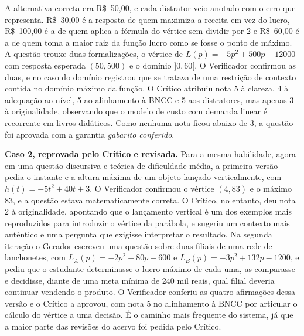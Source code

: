 \noindent A alternativa correta era R\$~50,00, e cada distrator veio anotado com o erro que
representa. R\$~30,00 é a resposta de quem maximiza a receita em vez do lucro, R\$~100,00 é a de
quem aplica a fórmula do vértice sem dividir por 2 e R\$~60,00 é a de quem toma a maior raiz da
função lucro como se fosse o ponto de máximo. A questão trouxe duas formalizações, o vértice de
$L(p) = -5p^2 + 500p - 12000$ com resposta esperada $(50, 500)$ e o domínio $]0, 60[$. O Verificador
confirmou as duas, e no caso do domínio registrou que se tratava de uma restrição de contexto contida
no domínio máximo da função. O Crítico atribuiu nota 5 à clareza, 4 à adequação ao nível, 5 ao
alinhamento à BNCC e 5 aos distratores, mas apenas 3 à originalidade, observando que o modelo de
custo com demanda linear é recorrente em livros didáticos. Como nenhuma nota ficou abaixo de 3, a
questão foi aprovada com a garantia \emph{gabarito conferido}.

\textbf{Caso 2, reprovada pelo Crítico e revisada.} Para a mesma habilidade, agora em uma questão
discursiva e teórica de dificuldade média, a primeira versão pedia o instante e a altura máxima de
um objeto lançado verticalmente, com $h(t) = -5t^2 + 40t + 3$. O Verificador confirmou o vértice
$(4, 83)$ e o máximo 83, e a questão estava matematicamente correta. O Crítico, no entanto, deu nota
2 à originalidade, apontando que o lançamento vertical é um dos exemplos mais reproduzidos para
introduzir o vértice da parábola, e sugeriu um contexto mais autêntico e uma pergunta que exigisse
interpretar o resultado. Na segunda iteração o Gerador escreveu uma questão sobre duas filiais de
uma rede de lanchonetes, com $L_A(p) = -2p^2 + 80p - 600$ e $L_B(p) = -3p^2 + 132p - 1200$, e
pediu que o estudante determinasse o lucro máximo de cada uma, as comparasse e decidisse, diante de
uma meta mínima de 240 mil reais, qual filial deveria continuar vendendo o produto. O Verificador
conferiu as quatro afirmações dessa versão e o Crítico a aprovou, com nota 5 no alinhamento à BNCC
por articular o cálculo do vértice a uma decisão. É o caminho mais frequente do sistema, já que a
maior parte das revisões do acervo foi pedida pelo Crítico.

